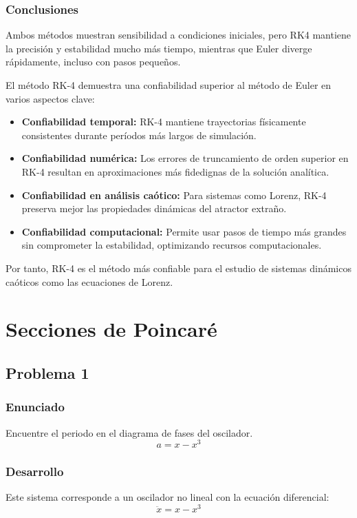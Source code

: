 \documentclass[a4paper,12pt]{article}
\theoremstyle{mytheor}
\begin{document}
\subsubsection{Conclusiones}
Ambos métodos muestran sensibilidad a condiciones iniciales, pero RK4 mantiene la precisión y estabilidad mucho más tiempo, mientras que Euler diverge rápidamente, incluso con pasos pequeños.

El método RK-4 demuestra una confiabilidad superior al método de Euler en varios aspectos clave:

\begin{itemize}
    \item \textbf{Confiabilidad temporal:} RK-4 mantiene trayectorias físicamente consistentes durante períodos más largos de simulación.
    \item \textbf{Confiabilidad numérica:} Los errores de truncamiento de orden superior en RK-4 resultan en aproximaciones más fidedignas de la solución analítica.
    \item \textbf{Confiabilidad en análisis caótico:} Para sistemas como Lorenz, RK-4 preserva mejor las propiedades dinámicas del atractor extraño.
    \item \textbf{Confiabilidad computacional:} Permite usar pasos de tiempo más grandes sin comprometer la estabilidad, optimizando recursos computacionales.
\end{itemize}

Por tanto, RK-4 es el método más confiable para el estudio de sistemas dinámicos caóticos como las ecuaciones de Lorenz.

\newpage

\section{Secciones de Poincaré}

\subsection{Problema 1}
\subsubsection{Enunciado}
Encuentre el periodo en el diagrama de fases del oscilador.
\begin{equation}
a = x - x^3
\end{equation}

\subsubsection{Desarrollo}
Este sistema corresponde a un oscilador no lineal con la ecuación diferencial:
\begin{equation}
\ddot{x} = x - x^3
\end{equation}
\end{document}
